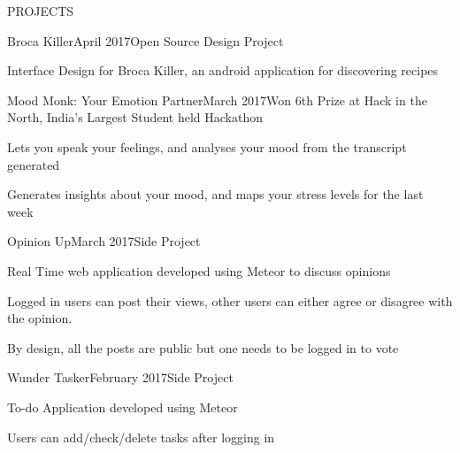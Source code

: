 \documentclass{resume} %
\begin{document}

\begin{rSection}{PROJECTS}




\begin{rSubsection}{Broca Killer}{April 2017}{Open Source Design Project}{}

\item Interface Design for Broca Killer, an android application for discovering recipes
\end{rSubsection}


\begin{rSubsection}{Mood Monk: Your Emotion Partner}{March 2017}{Won 6th Prize at Hack in the North, India's Largest Student held Hackathon}{}

\item Lets you speak your feelings, and analyses your mood from the transcript generated
\item Generates insights about your mood, and maps your stress levels for the last week
 
\end{rSubsection}  


\begin{rSubsection}{Opinion Up}{March 2017}{Side Project}{} 
\item Real Time web application developed using Meteor to discuss opinions
\item Logged in users can post their views, other users can either agree or disagree with the opinion.
\item By design, all the posts are public but one needs to be logged in to vote

\end{rSubsection}



\begin{rSubsection}{Wunder Tasker}{February 2017}{Side Project}{}

\item To-do Application developed using Meteor
\item Users can add/check/delete tasks after logging in
\end{rSubsection}


\end{rSection}
\end{document}
